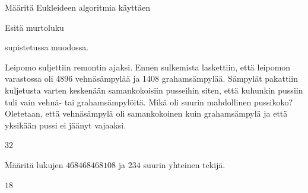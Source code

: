 \begin{tehtava}
    Määritä Eukleideen algoritmia käyttäen
    
    \begin{alakohdat}
    \end{alakohdat}

    \begin{vastaus}
        \begin{alakohdat}
        \end{alakohdat}
    \end{vastaus}
    
\end{tehtava}

\begin{tehtava}
    Esitä murtoluku
    \begin{alakohdat}
    \end{alakohdat}
    supistetussa muodossa.

    \begin{vastaus}
        \begin{alakohdat}
        \end{alakohdat}
    \end{vastaus}
    
\end{tehtava}

\begin{tehtava}
    Leipomo suljettiin remontin ajaksi. Ennen sulkemista laskettiin, että leipomon varastossa oli 4896 vehnäsämpylää ja 1408 grahamsämpylää. Sämpylät pakattiin kuljetusta varten keskenään samankokoisiin pusseihin siten, että kuhunkin pussiin tuli vain vehnä- tai grahamsämpylöitä. Mikä oli suurin mahdollinen pussikoko? Oletetaan, että vehnäsämpylä oli samankokoinen kuin grahamsämpylä ja että yksikään pussi ei jäänyt vajaaksi.

    \begin{vastaus}
        $32$
    \end{vastaus}
    
\end{tehtava}

\begin{tehtava}
    Määritä lukujen $468468468108$ ja $234$ suurin yhteinen tekijä.
    
    \begin{vastaus}
        $18$
    \end{vastaus}
    
\end{tehtava}

